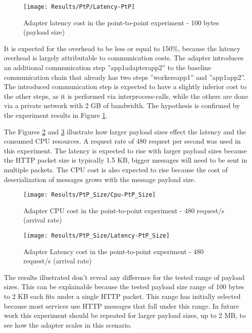 \begin{figure}[htbp]
    \centering
    \centerline{\texttt{[image: Results/PtP/Latency-PtP]}}
    \caption{Adapter latency cost in the point-to-point experiment - 100 bytes (payload size)}
    \label{fig:latPtP}
\end{figure}

It is expected for the overhead to be less or equal to 150\%, because the latency overhead is largely attributable to communication costs.
The adapter introduces an additional communication step ''app1\textrightarrow adapter\textrightarrow app2'' to the baseline communication chain that already has two steps ''workers\textrightarrow app1'' and ''app1\textrightarrow app2''.
The introduced communication step is expected to have a slightly inferior cost to the other steps, as it is performed via interprocess-calls, while the others are done via a private network with 2 GB of bandwidth.
The hypothesis is confirmed by the experiment results in Figure \ref{fig:latPtP}.

The Figures  \ref{fig:payloadCpuPtP} and \ref{fig:payloadLatPtP} illustrate how larger payload sizes effect the latency and the consumed CPU resources.
A request rate of 480 request per second was used in this experiment.
The latency is expected to rise with larger payload sizes because the HTTP packet size is typically 1.5 KB, bigger messages will need to be sent in multiple packets.
The CPU cost is also expected to rise because the cost of deserialization of messages grows with the message payload size.

\begin{figure}[htbp]
    \centering
    \centerline{\texttt{[image: Results/PtP\_Size/Cpu-PtP\_Size]}}
    \caption{Adapter CPU cost in the point-to-point experiment - 480 request/s (arrival rate)}
    \label{fig:payloadCpuPtP}
\end{figure}

\begin{figure}[htbp]
    \centering
    \centerline{\texttt{[image: Results/PtP\_Size/Latency-PtP\_Size]}}
    \caption{Adapter Latency cost in the point-to-point experiment - 480 request/s (arrival rate)}
    \label{fig:payloadLatPtP}
\end{figure}

The results illustrated don't reveal any difference for the tested range of payload sizes.
This can be explainable because the tested payload size range of 100 bytes to 2 KB each fits under a single HTTP packet.
This range has initially selected because most services use HTTP messages that fall under this range.
In future work this experiment should be repeated for larger payload sizes, up to 2 MB, to see how the adapter scales in this scenario.

